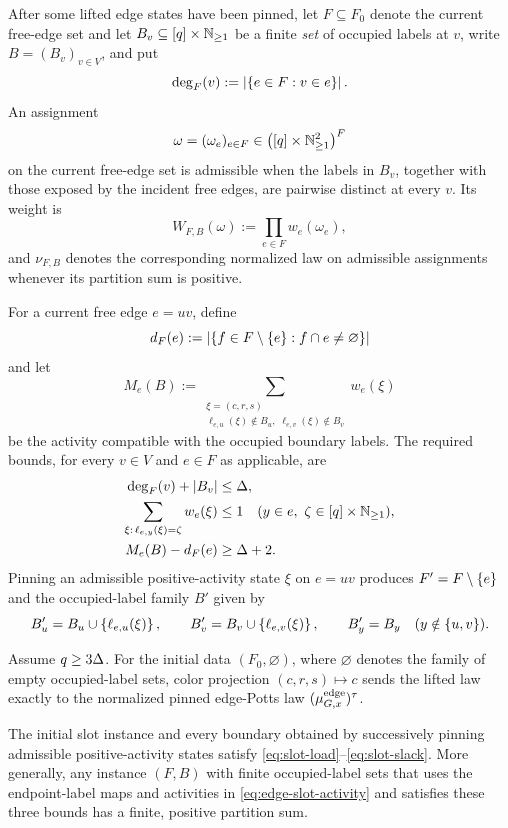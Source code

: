 After some lifted edge states have been pinned, let \(F\subseteq F_0\)
denote the current free-edge set and let \(B_v\subseteq
[q]\times\mathbb N_{\ge1}\) be a finite \emph{set} of occupied labels
at \(v\), write \(B=(B_v)_{v\in V}\), and put
\[
  \deg_F(v):=\left|\left\{e\in F:v\in e\right\}\right|.
\]
An assignment
\[
  \omega=(\omega_e)_{e\in F}
  \in\bigl([q]\times\mathbb N_{\ge1}^2\bigr)^F
\]
on the current free-edge set is admissible when
the labels in \(B_v\), together with those exposed by the incident free
edges, are pairwise distinct at every \(v\).  Its weight is
\[
  W_{F,B}(\omega):=\prod_{e\in F}w_e(\omega_e),
\]
and \(\nu_{F,B}\) denotes the corresponding normalized law on admissible
assignments whenever its partition sum is positive.

For a current free edge \(e=uv\), define
\[
  d_F(e)
  :=\left|\left\{f\in F\setminus\left\{e\right\}:f\cap e\ne\varnothing\right\}\right|
\]
and let
\[
  M_e(B)
  :=
  \sum_{\substack{\xi=(c,r,s)\\
       \ell_{e,u}(\xi)\notin B_u,\;
       \ell_{e,v}(\xi)\notin B_v}}
       w_e(\xi)
\]
be the activity compatible with the occupied boundary labels.  The
required bounds, for every \(v\in V\) and \(e\in F\) as applicable, are
\begin{align}
  \deg_F(v)+\left|B_v\right|&\le\Delta,
  \label{eq:slot-load}\\
  \sum_{\xi:\,\ell_{e,y}(\xi)=\zeta}w_e(\xi)&\le1
  \quad
  (y\in e,\ \zeta\in[q]\times\mathbb N_{\ge1}),
  \label{eq:slot-fibre}\\
  M_e(B)-d_F(e)&\ge\Delta+2.
  \label{eq:slot-slack}
\end{align}
Pinning an admissible positive-activity state \(\xi\) on \(e=uv\) produces
\(F'=F\setminus\left\{e\right\}\) and the occupied-label family \(B'\) given by
\[
 B'_u=B_u\cup\left\{\ell_{e,u}(\xi)\right\},\qquad
 B'_v=B_v\cup\left\{\ell_{e,v}(\xi)\right\},\qquad
 B'_y=B_y\quad(y\notin\{u,v\}).
\]
\begin{lemma}\label{lem:edge-slot-lift}
Assume \(q\ge3\Delta\).  For the initial data
\((F_0,\varnothing)\), where $\varnothing$ denotes the family of empty
occupied-label sets, color projection
\((c,r,s)\mapsto c\) sends the lifted law exactly to the normalized pinned
edge-Potts law \((\mu^{\mathrm{edge}}_{G,x})^\tau\).

The initial slot instance and every boundary obtained by successively
pinning admissible positive-activity states satisfy
\eqref{eq:slot-load}--\eqref{eq:slot-slack}.  More generally, any instance
\((F,B)\) with finite occupied-label sets that uses the endpoint-label maps
and activities in \eqref{eq:edge-slot-activity} and satisfies these three
bounds has a finite, positive partition sum.
\end{lemma}

